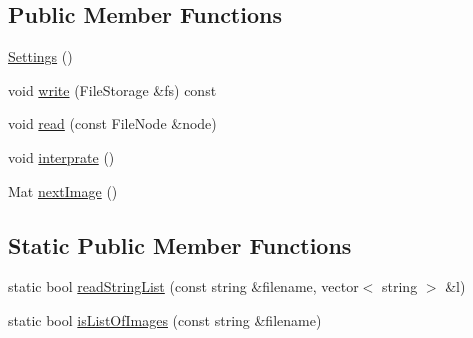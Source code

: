 \subsection*{Public Member Functions}
\begin{DoxyCompactItemize}
\item 
\mbox{\hyperlink{classSettings_ab7169a6eefce79566dd07db3b1e5e967}{Settings}} ()
\item 
void \mbox{\hyperlink{classSettings_a0785cc2055091b2a857b1dcefe291acc}{write}} (File\+Storage \&fs) const
\item 
void \mbox{\hyperlink{classSettings_a2d7841f8441095032e0f3b7d20adfd3f}{read}} (const File\+Node \&node)
\item 
void \mbox{\hyperlink{classSettings_ac01c17bf3536e296f1076e50cdcb00cd}{interprate}} ()
\item 
Mat \mbox{\hyperlink{classSettings_a7701462e928f2425b342440fba9973e5}{next\+Image}} ()
\end{DoxyCompactItemize}
\subsection*{Static Public Member Functions}
\begin{DoxyCompactItemize}
\item 
static bool \mbox{\hyperlink{classSettings_ae57696cead99c4f0c528e33793866457}{read\+String\+List}} (const string \&filename, vector$<$ string $>$ \&l)
\item 
static bool \mbox{\hyperlink{classSettings_ae7696860215ac20c48a5e7121c5dd32e}{is\+List\+Of\+Images}} (const string \&filename)
\end{DoxyCompactItemize}

